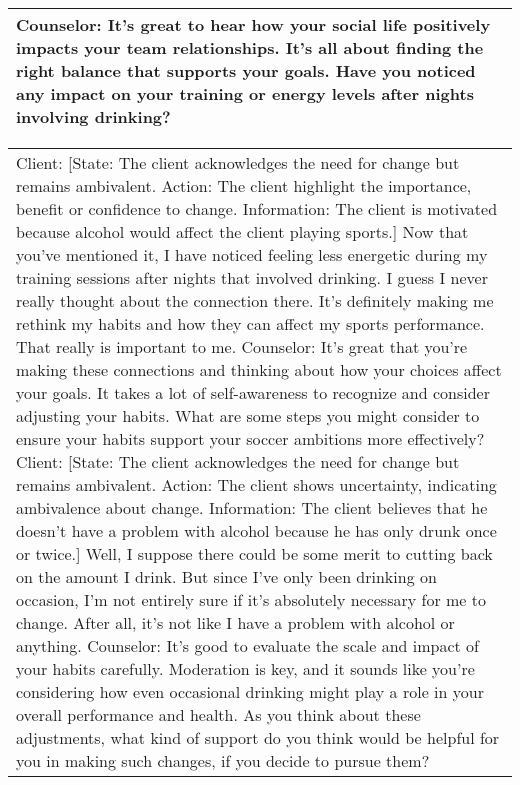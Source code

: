 \begin{table*}[tb]
\begin{tabularx}{\textwidth}{X}
Counselor: It's great to hear how your social life positively impacts your team relationships. It's all about finding the right balance that supports your goals.  Have you noticed any impact on your training or energy levels after nights involving drinking? \newline
\\ \bottomrule
\end{tabularx}
\caption{A generated conversation from our simulated client, Part 2. For better presentation, the instruction (in {\color{blue} blue}) is placed before the client's utterance, which should follow the counselor's utterance.}
\end{table*}


\begin{table*}[tb]
\begin{tabularx}{\textwidth}{X}
\toprule
Client: {\color{blue} [State: The client acknowledges the need for change but remains ambivalent.  Action: The client highlight the importance, benefit or confidence to change. Information: The client is motivated because alcohol would affect the client playing sports.]} Now that you've mentioned it, I have noticed feeling less energetic during my training sessions after nights that involved drinking. I guess I never really thought about the connection there. It's definitely making me rethink my habits and how they can affect my sports performance. That really is important to me. \newline
Counselor: It's great that you're making these connections and thinking about how your choices affect your goals. It takes a lot of self-awareness to recognize and consider adjusting your habits. What are some steps you might consider to ensure your habits support your soccer ambitions more effectively? \newline
Client: {\color{blue}  [State: The client acknowledges the need for change but remains ambivalent.  Action: The client shows uncertainty, indicating ambivalence about change. Information: The client believes that he doesn’t have a problem with alcohol because he has only drunk once or twice.]} Well, I suppose there could be some merit to cutting back on the amount I drink. But since I've only been drinking on occasion, I'm not entirely sure if it's absolutely necessary for me to change. After all, it's not like I have a problem with alcohol or anything. \newline
Counselor: It's good to evaluate the scale and impact of your habits carefully. Moderation is key, and it sounds like you're considering how even occasional drinking might play a role in your overall performance and health. As you think about these adjustments, what kind of support do you think would be helpful for you in making such changes, if you decide to pursue them? \newline

\end{tabularx}
\end{table*}
